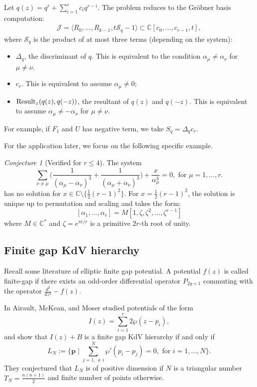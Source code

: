\documentclass[11pt]{amsart}
\theoremstyle{remark}
\newtheorem{conjecture}[theorem]{Conjecture}
\numberwithin{equation}{section}
\begin{document}
Let $q(z) = q^r + \sum_{i=1}^r c_i q^{r-i}$. The problem reduces to the Gr\"obner basis computation:
\[
\begin{split}
    \mathcal{J} = \Big\langle R_0, \dots, R_{k-1}, t \mathcal{S}_q -1\Big\rangle \subset \mathbb{C}[c_0,\dots,c_{r-1},t],
\end{split}
\]
where $\mathcal{S}_q$ is the product of at most three terms (depending on the system):
\begin{itemize}
    \item $\Delta_q$, the discriminant of $q$. This is equivalent to the condition $\alpha_\mu \neq \alpha_\nu$ for $\mu \neq \nu$.
    \item $c_r$. This is equivalent to assume $\alpha_\mu \neq 0$;
    \item ${\rm Result}_z (q(z), q(-z))$, the resultant of $q(z)$ and $q(-z)$. This is equivalent to assume $\alpha_\mu \neq - \alpha_\nu$ for $\mu \neq \nu$.
\end{itemize}
For example, if $F_1$ and $U$ has negative term, we take $S_q = \Delta_q  c_r$.

For the application later, we focus on the following specific example.
\begin{conjecture}[Verified for $r\leq 4$] \label{conj_Trei_rational}
The system 
\[
    \sum_{\nu\neq \mu}\Big( \frac{1}{(\alpha_\mu-\alpha_\nu)^3} + \frac{1}{(\alpha_\mu + \alpha_\nu)^3} \Big) + \frac{x}{\alpha_\mu^3}=0, \text{ for }\mu=1,\dots,r.
\]
has no solution for $x \in \mathbb{C} \setminus \{  \frac{1}{2}(r-1)^2 \}$. For $x = \frac{1}{2}(r-1)^2$, the solution is unique up to permutation and scaling and takes the form:
\[
    [\alpha_1,\dots,\alpha_r] = M [ 1, \zeta, \zeta^2, \dots, \zeta^{r-1} ]
\]
where $M \in \mathbb{C}^*$ and $\zeta = e^{\pi i / r}$ is a primitive $2r$-th root of unity.
\end{conjecture}

\subsection{Finite gap KdV hierarchy}
Recall some literature of elliptic finite gap potential. A potential $f(z)$ is called finite-gap if there exists an odd-order differential operator $P_{2g+1}$ commuting with the operator $\frac{d^2}{dz^2} - f(z)$.

In \cite{Airault_McKean_Moser_1977} Airault, McKean, and Moser studied potentials of the form  
\[
    I(z) = \sum_{i=1}^r 2 \wp(z- p_i),
\]
and show that $I(z) + B$ is a finite gap KdV hierarchy if and only if 
\[
    L_N := \Big\{ \mathbf{p} \mid \sum_{j =1, \neq i}^N \wp'(p_i-p_j) =0, \text{ for } i=1,\dots,N \Big\}.
\]
They conjectured that $L_N$ is of positive dimension if $N$ is a triangular number $T_N = \frac{n(n+1)}{2}$ and finite number of points otherwise.
\end{document}
